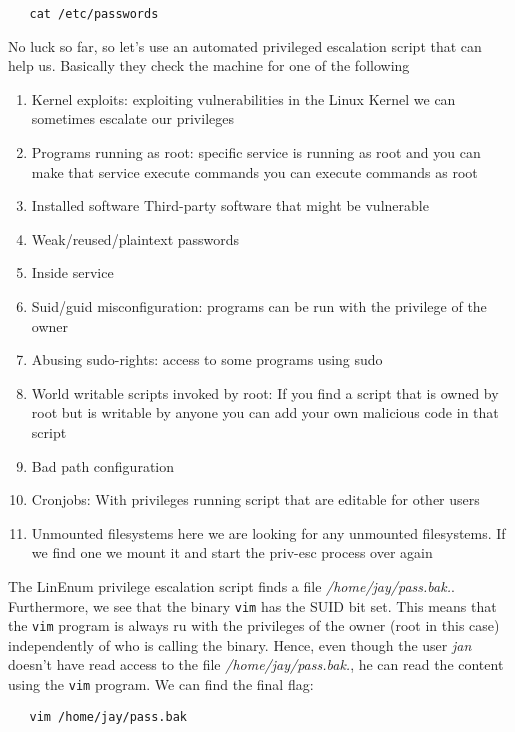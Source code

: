 \documentclass{article}
\begin{document}
\begin{lstlisting}
   cat /etc/passwords
\end{lstlisting}

No luck so far, so let's use an automated privileged escalation script that can help us. Basically they check the machine for one of the following

\begin{enumerate}
\item Kernel exploits: exploiting vulnerabilities in the Linux Kernel we can sometimes escalate our privileges
\item Programs running as root: specific service is running as root and you can make that service execute commands you can execute commands as root
\item Installed software Third-party software that might be vulnerable
\item Weak/reused/plaintext passwords
\item Inside service
\item Suid/guid misconfiguration: programs can be run with the privilege of the owner
\item Abusing sudo-rights: access to some programs using sudo
\item World writable scripts invoked by root: If you find a script that is owned by root but is writable by anyone you can add your own malicious code in that script
\item Bad path configuration
\item Cronjobs: With privileges running script that are editable for other users
\item Unmounted filesystems here we are looking for any unmounted filesystems. If we find one we mount it and start the priv-esc process over again
\end{enumerate}

The LinEnum privilege escalation script finds a file \textit{/home/jay/pass.bak.}. Furthermore, we see that the binary \texttt{vim} has the SUID bit set. This means that the \texttt{vim} program is always ru with the privileges of the owner (root in this case) independently of who is calling the binary. Hence, even though the user \textit{jan} doesn't have read access to the file \textit{/home/jay/pass.bak.}, he can read the content using the \texttt{vim} program. We can find the final flag:

\begin{lstlisting}
   vim /home/jay/pass.bak
\end{lstlisting}
\end{document}
